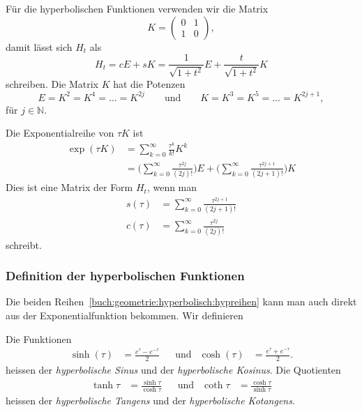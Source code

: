 Für die hyperbolischen Funktionen verwenden wir die Matrix
\[
K
=
\begin{pmatrix}
0&1\\
1&0
\end{pmatrix},
\]
damit lässt sich $H_t$ als
\[
H_t
=
c E + s K
=
\frac{1}{\sqrt{1+t^2}} E + \frac{t}{\sqrt{1+t^2}} K
\]
schreiben.
Die Matrix $K$ hat die Potenzen
\[
E
=
K^2 =  K^4 = \dots = K^{2j}
\qquad\text{und}\qquad
K
= K^3 = K^5 = \dots = K^{2j+1},
\]
für $j\in\mathbb{N}$.

Die Exponentialreihe von $\tau K$ ist
\begin{align*}
\exp(\tau K)
&=
\sum_{k=0}^\infty \frac{\tau^k}{k!} K^k
\\
&=
\biggl(
\sum_{k=0}^\infty \frac{\tau^{2j}}{(2j)!}
\biggr)
E
+
\biggl(
\sum_{k=0}^\infty \frac{\tau^{2j+1}}{(2j+1)!}
\biggr)
K
\end{align*}
Dies ist eine Matrix der Form $H_t$, wenn man
\begin{equation}
\begin{aligned}
s(\tau)&=
\sum_{k=0}^\infty \frac{\tau^{2j+1}}{(2j+1)!}
\\
c(\tau)&=
\sum_{k=0}^\infty \frac{\tau^{2j}}{(2j)!}
\end{aligned}
\label{buch:geometrie:hyperbolisch:hypreihen}
\end{equation}
schreibt.

\subsubsection{Definition der hyperbolischen Funktionen}
Die beiden Reihen~\eqref{buch:geometrie:hyperbolisch:hypreihen}
kann man auch direkt aus der Exponentialfunktion bekommen.
Wir definieren

\begin{definition}
\label{buch:geometrie:hyperbolisch:def}
Die Funktionen
\[
\begin{aligned}
\sinh(\tau)&=\frac{e^\tau-e^{-\tau}}2
&&\text{und}&
\cosh(\tau)&=\frac{e^\tau+e^{-\tau}}2.
\end{aligned}
\]
heissen der {\em hyperbolische Sinus} und der {\em hyperbolische Kosinus}.
Die Quotienten
\[
\begin{aligned}
\tanh\tau &= \frac{\sinh \tau}{\cosh \tau}
&&\text{und}&
\coth\tau &= \frac{\cosh \tau}{\sinh \tau}
\end{aligned}
\]
heissen der {\em hyperbolische Tangens} und der {\em hyperbolische Kotangens}.
\end{definition}

